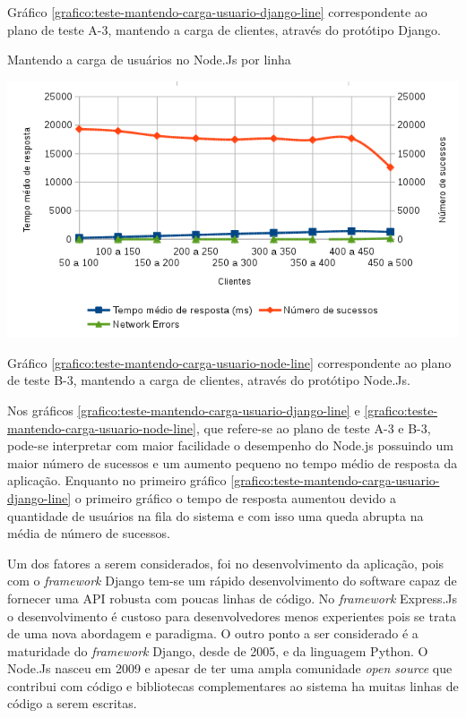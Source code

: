   Gráfico \ref{grafico:teste-mantendo-carga-usuario-django-line} correspondente ao plano de teste A-3, mantendo
  a carga de clientes, através do protótipo Django.
  
  \begin{grafico}[H]
    \setlength{\abovecaptionskip}{5pt}
    \setlength{\belowcaptionskip}{0pt}

    \caption[Mantendo a carga de usuários no Node.Js por linha]
	    {Mantendo a carga de usuários no Node.Js por linha}
    \centering
    \includegraphics[width=.80\textwidth]{imagem/graficos/grafico_node_plano_de_teste_3_line.png}
    \captionsetup[grafico]{justification=centering}
    \label{grafico:teste-mantendo-carga-usuario-node-line}
  \end{grafico}
  
  Gráfico \ref{grafico:teste-mantendo-carga-usuario-node-line} correspondente ao plano de teste B-3, mantendo
  a carga de clientes, através do protótipo Node.Js.
  
  Nos gráficos \ref{grafico:teste-mantendo-carga-usuario-django-line} e \ref{grafico:teste-mantendo-carga-usuario-node-line}, que
  refere-se ao plano de teste A-3 e B-3,  pode-se interpretar com maior facilidade o desempenho do Node.js possuindo um maior
  número de sucessos e um aumento pequeno no tempo médio de resposta da aplicação. Enquanto no primeiro gráfico 
  \ref{grafico:teste-mantendo-carga-usuario-django-line} o primeiro gráfico o tempo de resposta aumentou devido a quantidade
  de usuários na fila do sistema e com isso uma queda abrupta na média de número de sucessos.
  
  Um dos fatores a serem considerados, foi no desenvolvimento da aplicação, pois com o \textit{framework} Django tem-se um rápido 
  desenvolvimento do software capaz de fornecer uma API robusta com poucas linhas de código. No \textit{framework} Express.Js o desenvolvimento
  é custoso para desenvolvedores menos experientes pois se trata de uma nova abordagem e paradigma. 
  O outro ponto a ser considerado é a maturidade do \textit{framework} Django, desde de 2005, e da linguagem Python. O Node.Js
  nasceu em 2009 e apesar de ter uma ampla comunidade \textit{open source} que contribui com código e bibliotecas complementares
  ao sistema ha muitas linhas de código a serem escritas. 
 
